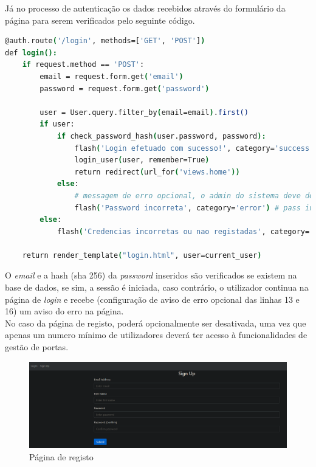 Já no processo de autenticação os dados recebidos através do formulário da
página para serem verificados pelo seguinte código.

\begin{lstlisting}[language=csh, caption={Autenticação na página de login}]
@auth.route('/login', methods=['GET', 'POST'])
def login():
    if request.method == 'POST':
        email = request.form.get('email')
        password = request.form.get('password')

        user = User.query.filter_by(email=email).first()
        if user:
            if check_password_hash(user.password, password):
                flash('Login efetuado com sucesso!', category='success')
                login_user(user, remember=True)
                return redirect(url_for('views.home'))
            else:
                # messagem de erro opcional, o admin do sistema deve decidir se quer usar ou nao
                flash('Password incorreta', category='error') # pass incorreta
        else:
            flash('Credencias incorretas ou nao registadas', category='error') # email nao registado

    return render_template("login.html", user=current_user)
\end{lstlisting}

O \textit{email} e a hash (sha 256) da \textit{password} inseridos são verificados 
se existem na base de dados, se sim, a sessão é iniciada, caso contrário, o utilizador 
continua na página de \textit{login} e recebe (configuração de aviso de erro opcional
das linhas 13 e 16) um aviso do erro na página. \\




No caso da página de registo, poderá opcionalmente ser desativada, uma vez que 
apenas um numero mínimo
de utilizadores deverá ter acesso à funcionalidades de gestão de portas. \\

\begin{figure}[H]
\begin{center}
\includegraphics[width=16cm]{figs/registo.png}
\caption{Página de registo}
\label{fig:bookstack}
\end{center}
\end{figure}




